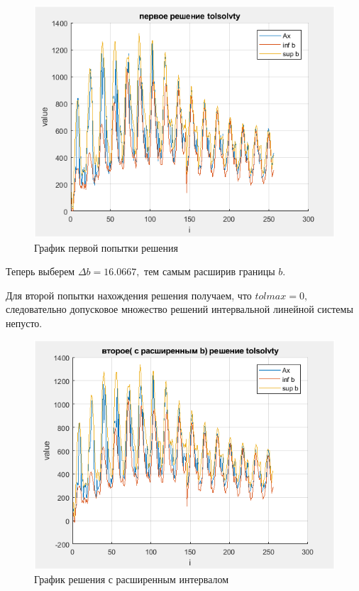 \documentclass[a4]{article}
\begin{document}
\begin{figure}[H]
\begin{center}
\caption{График первой попытки решения}
\includegraphics{pic2.png} 
\end{center}
\end{figure}


Теперь выберем $\Delta b = 16.0667,$ тем самым расширив границы $b.$

Для второй попытки нахождения решения получаем, что $tolmax=0,$ следовательно допусковое множество решений интервальной линейной системы непусто.

\begin{figure}[H]
\begin{center}
\caption{График решения с расширенным интервалом}
\includegraphics{pic3.png} 
\end{center}
\end{figure}
\end{document}

